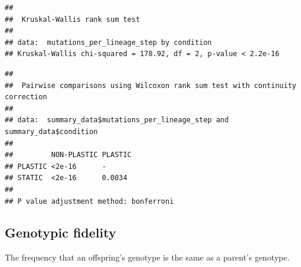 \documentclass[]{book}
\newenvironment{Shaded}{\begin{snugshade}}{\end{snugshade}}
\newcommand{\DataTypeTok}[1]{\textcolor[rgb]{0.13,0.29,0.53}{#1}}
\newcommand{\KeywordTok}[1]{\textcolor[rgb]{0.13,0.29,0.53}{\textbf{#1}}}
\newcommand{\NormalTok}[1]{#1}
\newcommand{\OperatorTok}[1]{\textcolor[rgb]{0.81,0.36,0.00}{\textbf{#1}}}
\newcommand{\StringTok}[1]{\textcolor[rgb]{0.31,0.60,0.02}{#1}}
\begin{document}
\begin{verbatim}
## 
##  Kruskal-Wallis rank sum test
## 
## data:  mutations_per_lineage_step by condition
## Kruskal-Wallis chi-squared = 178.92, df = 2, p-value < 2.2e-16
\end{verbatim}

\begin{Shaded}
\end{Shaded}

\begin{verbatim}
## 
##  Pairwise comparisons using Wilcoxon rank sum test with continuity correction 
## 
## data:  summary_data$mutations_per_lineage_step and summary_data$condition 
## 
##         NON-PLASTIC PLASTIC
## PLASTIC <2e-16      -      
## STATIC  <2e-16      0.0034 
## 
## P value adjustment method: bonferroni
\end{verbatim}

\hypertarget{genotypic-fidelity}{%
\subsection{Genotypic fidelity}\label{genotypic-fidelity}}

The frequency that an offspring's genotype is the same as a parent's genotype.
\end{document}
